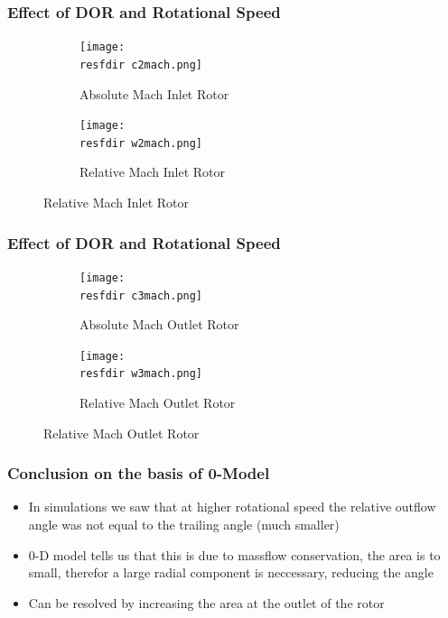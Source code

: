 \documentclass{beamer}
\newcommand{\resfdir}{../results/figures/}
\begin{document}
\begin{frame}
	\frametitle{Effect of DOR and Rotational Speed }

	\begin{figure}
	  \begin{subfigure}[b]{0.49\textwidth}
	    \texttt{[image: \\resfdir c2mach.png]}
	    \caption{Absolute Mach Inlet Rotor}
	    \label{fig:1}
	  \end{subfigure}
	  \begin{subfigure}[b]{0.49\textwidth}
	    \texttt{[image: \\resfdir w2mach.png]}
	    \caption{Relative Mach Inlet Rotor}
	    \label{fig:2}
	  \end{subfigure}
	\end{figure}
\end{frame}



\begin{frame}
	\frametitle{Effect of DOR and Rotational Speed }
	\begin{figure}
	  \begin{subfigure}[b]{0.49\textwidth}
	    \texttt{[image: \\resfdir c3mach.png]}
	    \caption{Absolute Mach Outlet Rotor}
	     \label{fig:1}
	  \end{subfigure}
	  \begin{subfigure}[b]{0.49\textwidth}
	    \texttt{[image: \\resfdir w3mach.png]}
	    \caption{Relative Mach Outlet Rotor}
	    \label{fig:2}
	  \end{subfigure}
	\end{figure}
\end{frame}


\begin{frame}
        \frametitle{Conclusion on the basis of 0-Model }
 	\begin{itemize}
	  \item  In simulations we saw that at higher rotational speed the relative outflow angle was not equal to the trailing angle (much smaller)
	  \item  0-D model tells us that this is due to massflow conservation, the area is to small, therefor a large radial component is neccessary, reducing the angle
	  \item Can be resolved by increasing the area at the outlet of the rotor
	\end{itemize}
\end{frame}
\end{document}
